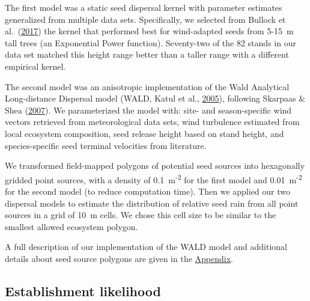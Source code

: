 \documentclass[
]{article}
\begin{document}
The first model was a static seed dispersal kernel with parameter estimates generalized from multiple data sets.
Specifically, we selected from Bullock et al.~(\protect\hyperlink{ref-bullockSynthesisEmpiricalPlant2017}{2017}) the kernel that performed best for wind-adapted seeds from 5-15~m tall trees (an Exponential Power function).
Seventy-two of the 82 stands in our data set matched this height range better than a taller range with a different empirical kernel.

The second model was an anisotropic implementation of the Wald Analytical Long-distance Dispersal model (WALD, Katul et al., \protect\hyperlink{ref-katulMechanisticAnalyticalModels2005}{2005}), following Skarpaas \& Shea (\protect\hyperlink{ref-skarpaasDispersalPatternsDispersal2007}{2007}).
We parameterized the model with: site- and season-specific wind vectors retrieved from meteorological data sets, wind turbulence estimated from local ecosystem composition, seed release height based on stand height, and species-specific seed terminal velocities from literature.

We transformed field-mapped polygons of potential seed sources into hexagonally gridded point sources, with a density of 0.1~m\textsuperscript{-2} for the first model and 0.01~m\textsuperscript{-2} for the second model (to reduce computation time).
Then we applied our two dispersal models to estimate the distribution of relative seed rain from all point sources in a grid of 10~m cells.
We chose this cell size to be similar to the smallest allowed ecosystem polygon.

A full description of our implementation of the WALD model and additional details about seed source polygons are given in the \protect\hyperlink{appendix}{Appendix}.

\hypertarget{establishment-likelihood}{%
\subsection{Establishment likelihood}\label{establishment-likelihood}}
\end{document}
